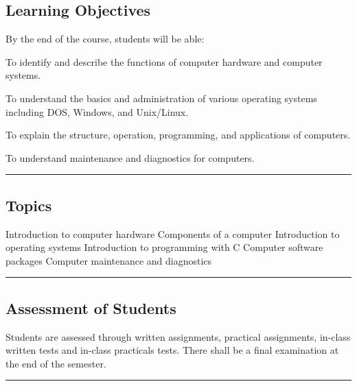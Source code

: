 \subsection*{Learning Objectives}
By the end of the course, students will be able:
\begin{outline}
    \1 To identify and describe the functions of computer hardware and computer systems.

    \1 To understand the basics and administration of various operating systems including DOS, Windows, and Unix/Linux.

    \1 To explain the structure, operation, programming, and applications of computers.

    \1 To understand maintenance and diagnostics for computers.
\end{outline}
\vspace{2ex}\hrule\vspace{2ex}

\subsection*{Topics}
\begin{outline}
    \1 Introduction to computer hardware
    \1 Components of a computer
    \1 Introduction to operating systems
    \1 Introduction to programming with C
    \1 Computer software packages
    \1 Computer maintenance and diagnostics
\end{outline}
\vspace{2ex} \hrule\vspace{2ex}

\subsection*{Assessment of Students}
\begin{outline}
    \1 Students are assessed through written assignments, practical assignments, in-class written tests and in-class practicals tests.
    \1 There shall be a final examination at the end of the semester.
\end{outline}
\vspace{2ex}\hrule\vspace{2ex}

